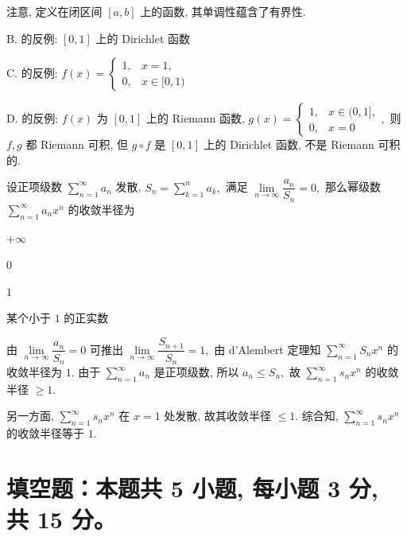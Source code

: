 \begin{solution}
注意, 定义在闭区间 $[a, b]$ 上的函数, 其单调性蕴含了有界性.

B. 的反例: $[0, 1]$ 上的 Dirichlet 函数

C. 的反例: $f(x) = \begin{cases}
1, & x = 1, \\
0, & x \in [0, 1)
\end{cases}$

D. 的反例: $f(x)$ 为 $[0, 1]$ 上的 Riemann 函数, $g(x) = \begin{cases}
1, & x \in (0, 1], \\
0, & x = 0
\end{cases},$ 则 $f, g$ 都 Riemann 可积, 但 $g\circ f$ 是 $[0, 1]$ 上的 Dirichlet 函数, 不是 Riemann 可积的.
\end{solution}

\begin{question}
设正项级数 $\sum\limits_{n=1}^{\infty} a_n$ 发散, $S_n = \sum\limits_{k=1}^{n} a_k,$ 满足 $\lim\limits_{n\to\infty} \dfrac{a_n}{S_n} = 0,$ 那么幂级数 $\sum\limits_{n=1}^{\infty} a_n x^n$ 的收敛半径为 \paren[C]

\begin{choices}
\item $+\infty$
\item $0$
\item $1$
\item 某个小于 $1$ 的正实数
\end{choices}
\end{question}

\begin{solution}
由 $\lim\limits_{n\to\infty} \dfrac{a_n}{S_n} = 0$ 可推出 $\lim\limits_{n\to\infty} \dfrac{S_{n+1}}{S_n} = 1,$ 由 d'Alembert 定理知 $\sum\limits_{n=1}^{\infty} S_n x^n$ 的收敛半径为 $1.$ 由于 $\sum\limits_{n=1}^{\infty} a_n$ 是正项级数, 所以 $a_n \leqslant S_n,$ 故 $\sum\limits_{n=1}^{\infty} s_n x^n$ 的收敛半径 $\geqslant 1.$

另一方面, $\sum\limits_{n=1}^{\infty} s_n x^n$ 在 $x = 1$ 处发散, 故其收敛半径 $\leqslant 1.$ 综合知, $\sum\limits_{n=1}^{\infty} s_n x^n$ 的收敛半径等于 $1.$
\end{solution}


\section{填空题：本题共 5 小题, 每小题 3 分, 共 15 分。}


